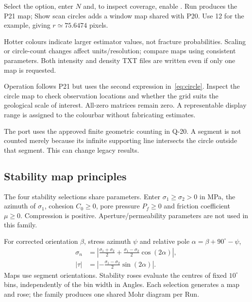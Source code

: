 Select the option, enter \(N\) and, to inspect coverage, enable . Run produces the P21 map; Show scan circles adds a window map shared with P20. Use 12 for the example, giving \(r\simeq75.6474\) pixels.

Hotter colours indicate larger estimator values, not fracture probabilities. Scaling or circle-count changes affect units/resolution; compare maps using consistent parameters. Both intensity and density TXT files are written even if only one map is requested.

Operation follows P21 but uses the second expression in~\eqref{eq:circle}. Inspect the circle map to check observation locations and whether the grid suits the geological scale of interest. All-zero matrices remain zero. A representable display range is assigned to the colourbar without fabricating estimates.

The port uses the approved finite geometric counting in Q-20. A segment is not counted merely because its infinite supporting line intersects the circle outside that segment. This can change legacy results.

\subsection{Stability map principles}\label{sec:stress}
The four stability selections share parameters. Enter \(\sigma_1\geq\sigma_2>0\) in MPa, the azimuth of \(\sigma_1\), cohesion \(C_0\geq0\), pore pressure \(P_f\geq0\) and friction coefficient \(\mu\geq0\). Compression is positive. Aperture/permeability parameters are not used in this family.

For corrected orientation \(\beta\), stress azimuth \(\psi\) and relative pole \(\alpha=\beta+90^\circ-\psi\),
\begin{align}
\sigma_n&=\left|\frac{\sigma_1+\sigma_2}{2}
+\frac{\sigma_1-\sigma_2}{2}\cos(2\alpha)\right|,\\
|\tau|&=\left|-\frac{\sigma_1-\sigma_2}{2}\sin(2\alpha)\right|.
\label{eq:stress}
\end{align}
Maps use segment orientations. Stability roses evaluate the centres of fixed \(10^\circ\) bins, independently of the bin width in Angles. Each selection generates a map and rose; the family produces one shared Mohr diagram per Run.

